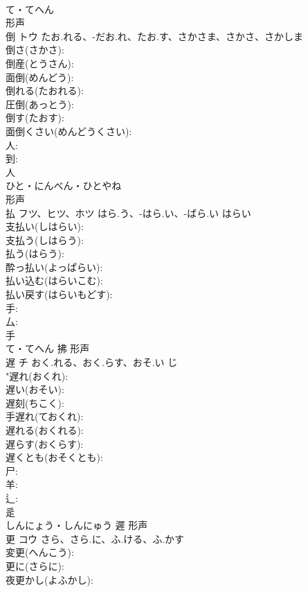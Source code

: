 \documentclass[8pt]{extreport}
\begin{document}
\begin{CJK}{UTF8}{min}
\\	て・てへん	
\\	形声 
\\	倒	トウ	たお.れる、-だお.れ、たお.す、さかさま、さかさ、さかしま		
\\	倒さ(さかさ): 
\\	倒産(とうさん): 
\\	面倒(めんどう): 
\\	倒れる(たおれる): 
\\	圧倒(あっとう): 
\\	倒す(たおす): 
\\	面倒くさい(めんどうくさい): 
\\	人: 
\\	到: 
\\	人	
\\	ひと・にんべん・ひとやね	
\\	形声 
\\	払	フツ、ヒツ、ホツ	はら.う、-はら.い、-ばら.い	はらい	
\\	支払い(しはらい): 
\\	支払う(しはらう): 
\\	払う(はらう): 
\\	酔っ払い(よっぱらい): 
\\	払い込む(はらいこむ): 
\\	払い戻す(はらいもどす): 
\\	手: 
\\	厶: 
\\	手	
\\	て・てへん	拂	形声 
\\	遅	チ	おく.れる、おく.らす、おそ.い	じ	
\\	"遅れ(おくれ): 
\\	遅い(おそい): 
\\	遅刻(ちこく): 
\\	手遅れ(ておくれ): 
\\	遅れる(おくれる): 
\\	遅らす(おくらす): 
\\	遅くとも(おそくとも): 
\\	尸: 
\\	羊: 
\\	辶: 
\\	辵	
\\	しんにょう・しんにゅう	遲	形声 
\\	更	コウ	さら、さら.に、ふ.ける、ふ.かす		
\\	変更(へんこう): 
\\	更に(さらに): 
\\	夜更かし(よふかし): 

\end{CJK}
\end{document}
